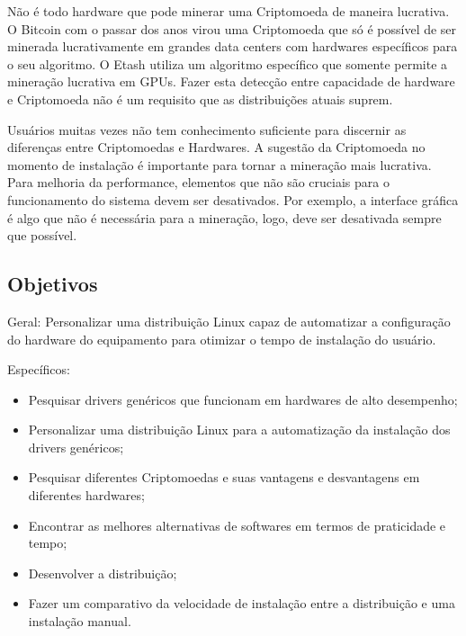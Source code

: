 \documentclass[
article,			%
12pt,				%
openright,			%
oneside,			%
a4paper,			%
chapter=TITLE,		%
section=TITLE,		%
subsection=TITLE,	%
subsubsection=TITLE,%
subsubsubsection=TITLE, %
english,			%
brazil,				%
]{abntex2}
\begin{document}
Não é todo hardware que pode minerar uma Criptomoeda de maneira
lucrativa. O Bitcoin com o passar dos anos virou uma Criptomoeda que
só é possível de ser minerada lucrativamente em grandes data centers
com hardwares específicos para o seu algoritmo. O Etash utiliza um
algoritmo específico que somente permite a mineração lucrativa em
GPUs. Fazer esta detecção entre capacidade de hardware e Criptomoeda
não é um requisito que as distribuições atuais suprem.

Usuários muitas vezes não tem conhecimento suficiente para discernir
as diferenças entre Criptomoedas e Hardwares. A sugestão da
Criptomoeda no momento de instalação é importante para tornar a
mineração mais lucrativa. Para melhoria da performance, elementos que
não são cruciais para o funcionamento do sistema devem ser
desativados. Por exemplo, a interface gráfica é algo que não é
necessária para a mineração, logo, deve ser desativada sempre que
possível.

\subsection{Objetivos}

Geral: Personalizar uma distribuição Linux capaz de automatizar a
configuração do hardware do equipamento para otimizar o tempo de
instalação do usuário.

Específicos: 
\begin{itemize} 

    \item Pesquisar drivers genéricos que funcionam em
        hardwares de alto desempenho;

    \item Personalizar uma distribuição Linux para a automatização da
        instalação dos drivers genéricos;

    \item Pesquisar diferentes Criptomoedas e suas vantagens e
        desvantagens em diferentes hardwares;

    \item Encontrar as melhores alternativas de softwares em termos de
        praticidade e tempo;

    \item Desenvolver a distribuição;

    \item Fazer um comparativo da velocidade de instalação entre a
distribuição e uma instalação manual.

\end{itemize}
\end{document}
